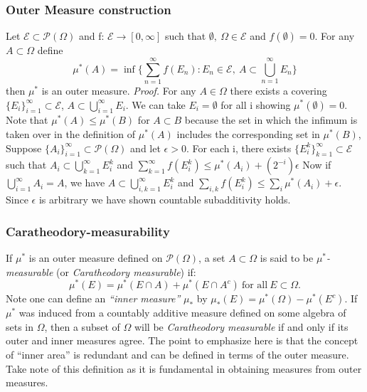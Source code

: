 \documentclass{article}
\begin{document}
\subsubsection{Outer Measure construction}
Let $\mathcal{E} \subset\mathcal{P}(\Omega)$ and f: $\mathcal{E} \to [0,\infty]$ such that $\emptyset, \ \Omega\in\mathcal{E}$ and $f(\emptyset)=0$. For any $A\subset \Omega$ define 
\[
\mu^*(A)=\inf \{\sum_{n=1}^{\infty}f(E_n): E_n \in \mathcal{E}, \ A\subset \bigcup_{n=1}^{\infty}E_n\}
\]
then $\mu^*$ is an outer measure.
\newline \newline
\textit{Proof.}\newline \newline
For any $A \in \Omega$ there exists a covering $\{E_i\}_{i=1}^{\infty}\subset \mathcal{E}$, $A\subset\bigcup_{i=1}^{\infty}E_i.$ We can take $E_i=\emptyset$ for all i showing $\mu^*(\emptyset) = 0$. Note that $\mu^*(A)\leq\mu^*(B)$ for $A\subset B$ because the set in which the infimum is taken over in the definition of $\mu^*(A)$ includes the corresponding set in $\mu^*(B)$,
Suppose $\{A_i\}_{i=1}^{\infty} \subset \mathcal{P}(\Omega)$ and let $\epsilon>0$. For each i, there exists $\{E_i^k\}_{k=1}^{\infty} \subset \mathcal{E}$ such that $A_i \subset \bigcup_{k=1}^{\infty}E^k_i$ and $\sum_{k=1}^{\infty}f(E^k_i) \leq \mu^*(A_i)+(2^{-i})\epsilon$ \newline \newline
Now if $\bigcup_{i=1}^{\infty}A_i=A$, we have $A\subset\bigcup_{i,k=1}^{\infty}E^k_i$ and $\sum_{i,k}f(E^k_i)\leq\sum_i\mu^*(A_i) +\epsilon$. Since $\epsilon$ is arbitrary we have shown countable subadditivity holds.

\subsubsection{Caratheodory-measurability}
If $\mu^*$ is an outer measure defined on $\mathcal{P}(\Omega)$, a set $A\subset \Omega$ is said to be \emph{$\mu^*$-measurable} (or \emph{Caratheodory measurable}) if:
\[
\mu^*(E) = \mu^*(E\cap A)+\mu^*(E\cap A^c) \ \text{for all} \ E \subset \Omega.
\]
Note one can define an \emph{``inner measure''} $\mu_*$ by $\mu_*(E)=\mu^*(\Omega)-\mu^*(E^c)$. If $\mu^*$ was induced from a countably additive measure defined on some algebra of sets in $\Omega$, then a subset of $\Omega$ will be \emph{Caratheodory measurable} if and only if its outer and inner measures agree.
\newline \newline 
The point to emphasize here is that the concept of ``inner area'' is redundant and can be defined in terms of the outer measure. Take note of this definition as it is fundamental in obtaining measures from outer measures.
\end{document}
